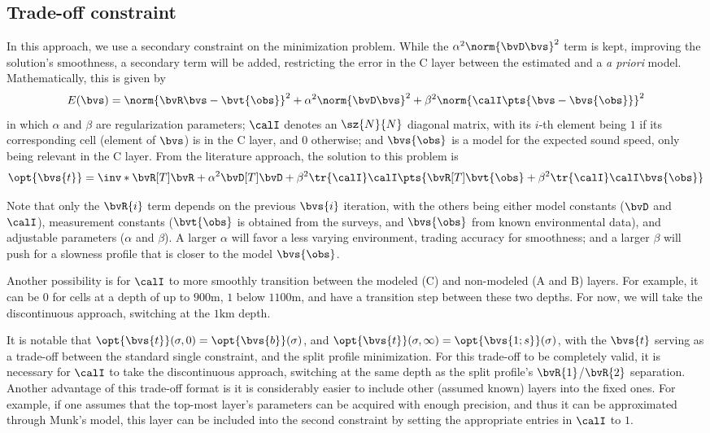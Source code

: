 \subsection{Trade-off constraint}
In this approach, we use a secondary constraint on the minimization problem. While the $\alpha^2 \norm{\bvD \bvs}^2$ term is kept, improving the solution's smoothness, a secondary term will be added, restricting the error in the C layer between the estimated and a \textit{a priori} model. Mathematically, this is given by
\begin{equation}
	E(\bvs) = \norm{\bvR \bvs - \bvt{\obs}}^2 + \alpha^2 \norm{\bvD \bvs}^2 + \beta^2 \norm{\calI\pts{\bvs - \bvs{\obs}}}^2
\end{equation}
in which $\alpha$ and $\beta$ are regularization parameters; $\calI$ denotes an $\sz{N}{N}$ diagonal matrix, with its $i$-th element being $1$ if its corresponding cell (element of $\bvs$) is in the C layer, and $0$ otherwise; and $\bvs{\obs}$ is a model for the expected sound speed, only being relevant in the C layer. From the literature approach, the solution to this problem is
\begin{equation}
	\opt{\bvs{t}} = \inv*{\bvR[T] \bvR + \alpha^2 \bvD[T] \bvD + \beta^2 \tr{\calI} \calI} \pts{\bvR[T] \bvt{\obs} + \beta^2 \tr{\calI}\calI \bvs{\obs}}
\end{equation}

Note that only the $\bvR{i}$ term depends on the previous $\bvs{i}$ iteration, with the others being either model constants ($\bvD$ and $\calI$), measurement constants ($\bvt{\obs}$ is obtained from the surveys, and $\bvs{\obs}$ from known environmental data), and adjustable parameters ($\alpha$ and $\beta$). A larger $\alpha$ will favor a less varying environment, trading accuracy for smoothness; and a larger $\beta$ will push for a slowness profile that is closer to the model $\bvs{\obs}$.

Another possibility is for $\calI$ to more smoothly transition between the modeled (C) and non-modeled (A and B) layers. For example, it can be $0$ for cells at a depth of up to $900\si{\meter}$, $1$ below $1100\si{\meter}$, and have a transition step between these two depths. For now, we will take the discontinuous approach, switching at the $1\si{\kilo\meter}$ depth.

It is notable that $\opt{\bvs{t}}(\sigma,0) = \opt{\bvs{b}}(\sigma)$, and $\opt{\bvs{t}}(\sigma,\infty) = \opt{\bvs{1;s}}(\sigma)$, with the $\bvs{t}$ serving as a trade-off between the standard single constraint, and the split profile minimization. For this trade-off to be completely valid, it is necessary for $\calI$ to take the discontinuous approach, switching at the same depth as the split profile's $\bvR{1}$/$\bvR{2}$ separation. Another advantage of this trade-off format is it is considerably easier to include other (assumed known) layers into the fixed ones. For example, if one assumes that the top-most layer's parameters can be acquired with enough precision, and thus it can be approximated through Munk's model, this layer can be included into the second constraint by setting the appropriate entries in $\calI$ to $1$.

